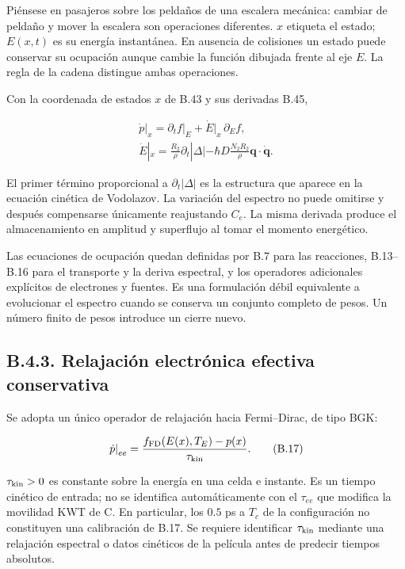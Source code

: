 \documentclass[
  spanish,
  10pt,
  a4paper,
]{article}
\begin{document}
Piénsese en pasajeros sobre los peldaños de una escalera mecánica:
cambiar de peldaño y mover la escalera son operaciones diferentes. \(x\)
etiqueta el estado; \(E(x,t)\) es su energía instantánea. En ausencia de
colisiones un estado puede conservar su ocupación aunque cambie la
función dibujada frente al eje \(E\). La regla de la cadena distingue
ambas operaciones.

Con la coordenada de estados \(x\) de B.43 y sus derivadas B.45,

\[
\begin{gathered}
\left.\dot p\right|_x=
\left.\partial_tf\right|_E+\dot E|_x\,\partial_Ef,\\
\dot E|_x=\frac{R_2}{\rho}\partial_t|\Delta|
-\hbar D\frac{N_2R_2}{\rho}\mathbf q\cdot\dot{\mathbf q}.
\end{gathered} \tag{B.16}
\]

El primer término proporcional a \(\partial_t|\Delta|\) es la estructura
que aparece en la ecuación cinética de Vodolazov. La variación del
espectro no puede omitirse y después compensarse únicamente reajustando
\(C_e\). La misma derivada produce el almacenamiento en amplitud y
superflujo al tomar el momento energético.

Las ecuaciones de ocupación quedan definidas por B.7 para las
reacciones, B.13--B.16 para el transporte y la deriva espectral, y los
operadores adicionales explícitos de electrones y fuentes. Es una
formulación débil equivalente a evolucionar el espectro cuando se
conserva un conjunto completo de pesos. Un número finito de pesos
introduce un cierre nuevo.

\subsection{B.4.3. Relajación electrónica efectiva
conservativa}\label{b.4.3.-relajaciuxf3n-electruxf3nica-efectiva-conservativa}

Se adopta un único operador de relajación hacia Fermi--Dirac, de tipo
BGK:

\[
\left.\dot p\right|_{ee}
=\frac{f_{\rm FD}(E(x),T_E)-p(x)}{\tau_{\rm kin}}.
\tag{B.17}
\]

\(\tau_{\rm kin}>0\) es constante sobre la energía en una celda e
instante. Es un tiempo cinético de entrada; no se identifica
automáticamente con el \(\tau_{ee}\) que modifica la movilidad KWT de C.
En particular, los \(0.5\) ps a \(T_c\) de la configuración no
constituyen una calibración de B.17. Se requiere identificar
\(\tau_{\rm kin}\) mediante una relajación espectral o datos cinéticos
de la película antes de predecir tiempos absolutos.
\end{document}
